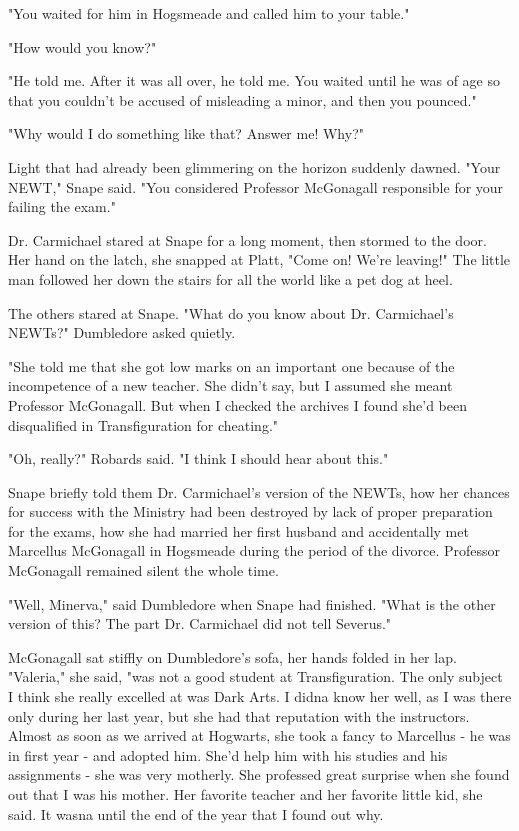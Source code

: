 \documentclass[a4paper,11pt]{article}
\begin{document}
"You waited for him in Hogsmeade and called him to your table."

"How would you know?"

"He told me. After it was all over, he told me. You waited until he was of age so that you couldn't be accused of misleading a minor, and then you pounced."

"Why would I do something like that? Answer me! Why?"

Light that had already been glimmering on the horizon suddenly dawned. "Your NEWT," Snape said. "You considered Professor McGonagall responsible for your failing the exam."

Dr. Carmichael stared at Snape for a long moment, then stormed to the door. Her hand on the latch, she snapped at Platt, "Come on! We're leaving!" The little man followed her down the stairs for all the world like a pet dog at heel.

The others stared at Snape. "What do you know about Dr. Carmichael's NEWTs?" Dumbledore asked quietly.

"She told me that she got low marks on an important one because of the incompetence of a new teacher. She didn't say, but I assumed she meant Professor McGonagall. But when I checked the archives I found she'd been disqualified in Transfiguration for cheating."

"Oh, really?" Robards said. "I think I should hear about this."

Snape briefly told them Dr. Carmichael's version of the NEWTs, how her chances for success with the Ministry had been destroyed by lack of proper preparation for the exams, how she had married her first husband and accidentally met Marcellus McGonagall in Hogsmeade during the period of the divorce. Professor McGonagall remained silent the whole time.

"Well, Minerva," said Dumbledore when Snape had finished. "What is the other version of this? The part Dr. Carmichael did not tell Severus."

McGonagall sat stiffly on Dumbledore's sofa, her hands folded in her lap. "Valeria," she said, "was not a good student at Transfiguration. The only subject I think she really excelled at was Dark Arts. I didna know her well, as I was there only during her last year, but she had that reputation with the instructors. Almost as soon as we arrived at Hogwarts, she took a fancy to Marcellus - he was in first year - and adopted him. She'd help him with his studies and his assignments - she was very motherly. She professed great surprise when she found out that I was his mother. Her favorite teacher and her favorite little kid, she said. It wasna until the end of the year that I found out why.
\end{document}
